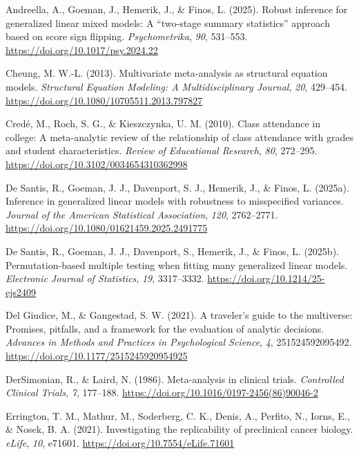 \documentclass[
  man,
  longtable,
  nolmodern,
  notxfonts,
  notimes,
  colorlinks=true,linkcolor=blue,citecolor=blue,urlcolor=blue]{apa7}
\newlength{\cslhangindent}
\newenvironment{CSLReferences}[2] %
 {\begin{list}{}{%
  \setlength{\itemindent}{0pt}
  \setlength{\leftmargin}{0pt}
  \setlength{\parsep}{0pt}
  \ifodd #1
   \setlength{\leftmargin}{\cslhangindent}
   \setlength{\itemindent}{-1\cslhangindent}
  \fi
  \setlength{\itemsep}{#2\baselineskip}}}
 {\end{list}}
\begin{document}
\label{refs}
\begin{CSLReferences}{1}{0}
Andreella, A., Goeman, J., Hemerik, J., \& Finos, L. (2025). {Robust
inference for generalized linear mixed models: A {``two-stage summary
statistics''} approach based on score sign flipping}.
\emph{Psychometrika}, \emph{90}, 531--553.
\url{https://doi.org/10.1017/psy.2024.22}

Cheung, M. W.-L. (2013). {Multivariate meta-analysis as structural
equation models}. \emph{Structural Equation Modeling: A
Multidisciplinary Journal}, \emph{20}, 429--454.
\url{https://doi.org/10.1080/10705511.2013.797827}

Credé, M., Roch, S. G., \& Kieszczynka, U. M. (2010). {Class attendance
in college: A meta-analytic review of the relationship of class
attendance with grades and student characteristics}. \emph{Review of
Educational Research}, \emph{80}, 272--295.
\url{https://doi.org/10.3102/0034654310362998}

De Santis, R., Goeman, J. J., Davenport, S. J., Hemerik, J., \& Finos,
L. (2025a). {Inference in generalized linear models with robustness to
misspecified variances}. \emph{Journal of the American Statistical
Association}, \emph{120}, 2762--2771.
\url{https://doi.org/10.1080/01621459.2025.2491775}

De Santis, R., Goeman, J. J., Davenport, S., Hemerik, J., \& Finos, L.
(2025b). {Permutation-based multiple testing when fitting many
generalized linear models}. \emph{Electronic Journal of Statistics},
\emph{19}, 3317--3332. \url{https://doi.org/10.1214/25-ejs2409}

Del Giudice, M., \& Gangestad, S. W. (2021). {A traveler's guide to the
multiverse: Promises, pitfalls, and a framework for the evaluation of
analytic decisions}. \emph{Advances in Methods and Practices in
Psychological Science}, \emph{4}, 251524592095492.
\url{https://doi.org/10.1177/2515245920954925}

DerSimonian, R., \& Laird, N. (1986). {Meta-analysis in clinical
trials}. \emph{Controlled Clinical Trials}, \emph{7}, 177--188.
\url{https://doi.org/10.1016/0197-2456(86)90046-2}

Errington, T. M., Mathur, M., Soderberg, C. K., Denis, A., Perfito, N.,
Iorns, E., \& Nosek, B. A. (2021). {Investigating the replicability of
preclinical cancer biology}. \emph{eLife}, \emph{10}, e71601.
\url{https://doi.org/10.7554/eLife.71601}


\end{CSLReferences}
\end{document}
